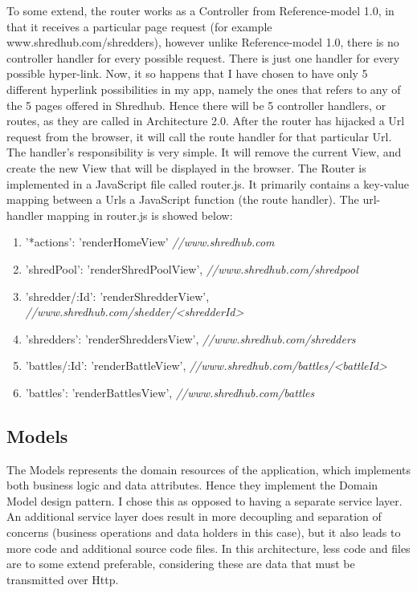 To some extend, the router works as a Controller from Reference-model 1.0, in that it receives a particular page request (for example www.shredhub.com/shredders), however unlike Reference-model 1.0, there is no controller handler for every possible request. There is just one handler for every possible hyper-link. Now, it so happens that I have chosen to have only 5 different hyperlink possibilities in my app, namely the ones that refers to any of the 5 pages offered in Shredhub. Hence there will be 5 controller handlers, or routes, as they are called in Architecture 2.0. After the router has hijacked a Url request from the browser, it will call the route handler for that particular Url. The handler's responsibility is very simple. It will remove the current View, and create the new View that will be displayed in the browser. The Router is implemented in a JavaScript file called router.js. It primarily contains a key-value mapping between a Urls a JavaScript function (the route handler). The url-handler mapping in router.js is showed below:

\begin{enumerate}
\item{} '*actions':	'renderHomeView' \textit{ //www.shredhub.com}
\item{} 'shredPool': 	'renderShredPoolView', \textit{//www.shredhub.com/shredpool}
\item{} 'shredder/:Id':	'renderShredderView', \textit{//www.shredhub.com/shedder/<shredderId>}
\item{} 'shredders': 	'renderShreddersView', \textit{//www.shredhub.com/shredders}
\item{} 'battles/:Id':	'renderBattleView', \textit{//www.shredhub.com/battles/<battleId>}
\item{} 'battles':	'renderBattlesView', \textit{//www.shredhub.com/battles}
\end{enumerate}

\subsection{Models}
The Models represents the domain resources of the application, which implements both business logic and data attributes. Hence they implement the Domain Model design pattern. I chose this as opposed to having a separate service layer. An additional service layer does result in more decoupling and separation of concerns (business operations and data holders in this case), but it also leads to more code and additional source code files. In this architecture, less code and files are to some extend preferable, considering these are data that must be transmitted over Http.

